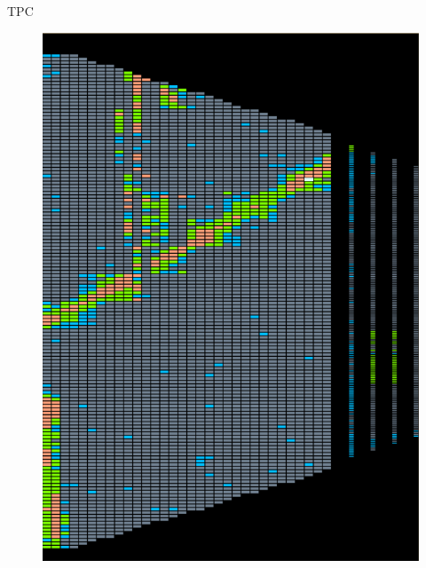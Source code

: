 \documentclass[18pt,notheorems,hyperref={pdfauthor=whatever}]{beamer}
\begin{document}
\begin{frame}{TPC}
\begin{figure}[h!]
\begin{minipage}{0.5\textwidth}
        \includegraphics[scale=0.45]{images/TPC_endcap_traj.png}   
    \end{minipage}
\end{figure}		 	
		 	
\end{frame}
\end{document}
